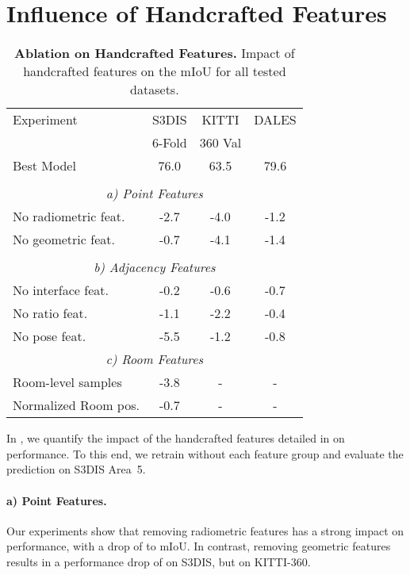 \section{Influence of Handcrafted Features}
\label{sec:hfablation}

\begin{table}
\caption{\textbf{Ablation on Handcrafted Features.} Impact of handcrafted features on the mIoU for all tested datasets.}
\label{tab:hfablation}
\centering
\small{
\begin{tabular}{@{}lccc@{}}
    \toprule
    Experiment & S3DIS & KITTI & DALES \\
     & 6-Fold & 360 Val & \\
    \midrule
    Best Model           & 76.0 & 63.5 & 79.6 \\
    \\
    \multicolumn{4}{c}{\textit{a)  Point Features}} \\
    \midrule
    No radiometric feat. & -2.7 & -4.0 & -1.2 \\
    No geometric feat.   & -0.7 & -4.1 & -1.4 \\
    \\
    \multicolumn{4}{c}{\textit{b) Adjacency Features}} \\
    \midrule 
    No interface feat.   & -0.2 & -0.6 & -0.7 \\
    No ratio feat.       & -1.1 & -2.2 & -0.4 \\
    No pose feat.        & -5.5 & -1.2 & -0.8 \\
    \multicolumn{4}{c}{\textit{c) Room Features}} \\
    \midrule
    Room-level samples   & -3.8 & - & - \\
    Normalized Room pos.        & -0.7 & - & - \\   
    \bottomrule
\end{tabular}}
\end{table} 
In , we quantify the impact of the handcrafted features detailed in  on performance. To this end, we retrain \SHORTHAND without each feature group and evaluate the prediction on S3DIS Area~5. 

\paragraph{a) Point Features.} Our experiments show that removing radiometric features has a strong impact on performance, with a drop 
of  to  mIoU.
In contrast, removing geometric features 
results in a performance drop 
of  on S3DIS, but  on KITTI-360.

